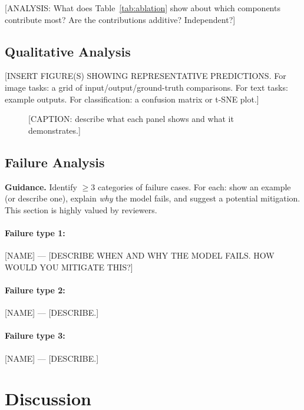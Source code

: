 \documentclass[11pt, letterpaper]{article}
\begin{document}
[ANALYSIS: What does Table~\ref{tab:ablation} show about which components
contribute most? Are the contributions additive? Independent?]

\subsection{Qualitative Analysis}

[INSERT FIGURE(S) SHOWING REPRESENTATIVE PREDICTIONS. For image tasks: a grid
of input/output/ground-truth comparisons. For text tasks: example outputs.
For classification: a confusion matrix or t-SNE plot.]

\begin{figure}[h]
  \centering
  \caption{[CAPTION: describe what each panel shows and what it demonstrates.]}
  \label{fig:qual}
\end{figure}

\subsection{Failure Analysis}

\begin{guidancebox}
\textbf{Guidance.} Identify $\geq$3 categories of failure cases. For each:
show an example (or describe one), explain \emph{why} the model fails,
and suggest a potential mitigation. This section is highly valued by reviewers.
\end{guidancebox}

\paragraph{Failure type 1:} [NAME] --- [DESCRIBE WHEN AND WHY THE MODEL FAILS.
HOW WOULD YOU MITIGATE THIS?]

\paragraph{Failure type 2:} [NAME] --- [DESCRIBE.]

\paragraph{Failure type 3:} [NAME] --- [DESCRIBE.]

\section{Discussion}
\end{document}
